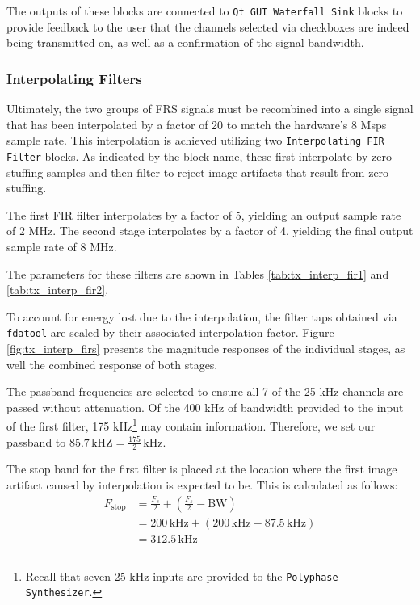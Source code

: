 The outputs of these blocks are connected to \texttt{Qt GUI Waterfall Sink}
blocks to provide feedback to the user that the channels selected via
checkboxes are indeed being transmitted on, as well as a confirmation of the
signal bandwidth.

\subsubsection{Interpolating Filters}

Ultimately, the two groups of \ac{FRS} signals must be recombined into a single
signal that has been interpolated by a factor of 20 to match the hardware's 8 Msps
sample rate.  This interpolation is achieved utilizing two
\texttt{Interpolating \ac{FIR} Filter} blocks. As indicated by the block name,
these first interpolate by zero-stuffing samples and then filter to reject
image artifacts that result from zero-stuffing.

The first \ac{FIR} filter interpolates by a factor of 5, yielding an output
sample rate of 2 MHz. The second stage interpolates by a factor of 4, yielding
the final output sample rate of 8 MHz.

The parameters for these filters are shown in Tables \ref{tab:tx_interp_fir1}
and \ref{tab:tx_interp_fir2}.

To account for energy lost due to the interpolation, the filter taps obtained
via \texttt{fdatool} are scaled by their associated interpolation factor. Figure
\ref{fig:tx_interp_firs} presents the magnitude responses of the individual
stages, as well the combined response of both stages.

The passband frequencies are selected to ensure all 7 of the 25 kHz channels
are passed without attenuation. Of the 400 kHz of bandwidth provided to the
input of the first filter, 175 kHz\footnote{Recall that seven 25 kHz inputs
are provided to the \texttt{Polyphase Synthesizer}.} may contain information.
Therefore, we set our passband to $85.7 \, \text{kHZ} = \frac{175}{2}
\,\text{kHz}$.

The stop band for the first filter is placed at the location where the first
image artifact caused by interpolation is expected to be. This is calculated as
follows:
\begin{align*}
  F_{\text{stop}} &= \frac{F_s}{2} + \left( \frac{F_s}{2} - \text{BW} \right) \\
  &= 200 \,\text{kHz} + \left( 200 \,\text{kHz} - 87.5 \,\text{kHz} \right) \\
  &= 312.5 \,\text{kHz}
\end{align*}

